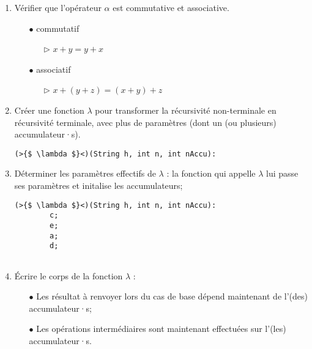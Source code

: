 \documentclass[a4paper, 11pt, oneside]{article}
\begin{document}
		\begin{enumerate}
			
			\item Vérifier que l'opérateur $\alpha$ est commutative et associative.
				\begin{itemize}
					\item[$\bullet$] commutatif
					\begin{itemize}
						\item[$\triangleright$] $x + y = y + x $
					\end{itemize}
										
					\item[$\bullet$] associatif
					\begin{itemize}
						\item[$\triangleright$] $x + (y + z) = (x + y) + z$
					\end{itemize}
				\end{itemize}
				
				
			\item Créer une fonction $\lambda$ pour transformer la récursivité non-terminale en récursivité terminale, avec plus
				  de paramètres (dont un (ou plusieurs) accumulateur·s).
				  
				\begin{lstlisting}[caption={lambda\_1}]
(>{$ \lambda $}<)(String h, int n, int nAccu):

				\end{lstlisting}
			
			
			\item Déterminer les paramètres effectifs de $\lambda$ : la fonction qui appelle $\lambda$ lui passe ses paramètres et initalise
					les accumulateurs;

				\begin{lstlisting}[caption={lambda\_2}]
(>{$ \lambda $}<)(String h, int n, int nAccu):
		c;
		e;
		a;
		d;
		
				\end{lstlisting}
					
					
			\item Écrire le corps de la fonction $\lambda$ :
				\begin{itemize}
					\item[$\bullet$] Les résultat à renvoyer lors du cas de base dépend maintenant de l'(des) accumulateur·s;
					\item[$\bullet$] Les opérations intermédiaires sont maintenant effectuées sur l'(les) accumulateur·s.
				\end{itemize}


\end{enumerate}
\end{document}
